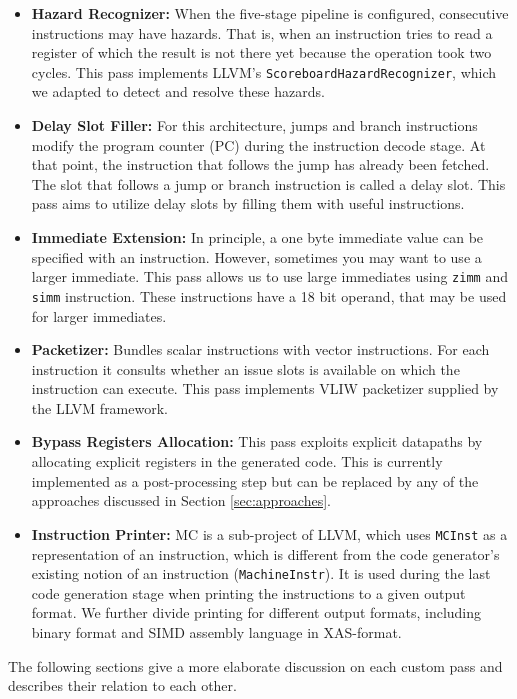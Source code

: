 \begin{itemize}
	\item \textbf{Hazard Recognizer:} When the five-stage pipeline is configured, consecutive instructions may have hazards. That is, when an instruction tries to read a register of which the result is not there yet because the operation took two cycles. This pass implements LLVM's \texttt{ScoreboardHazardRecognizer}, which we adapted to detect and resolve these hazards.
	\item \textbf{Delay Slot Filler:} For this architecture, jumps and branch instructions modify the program counter (PC) during the instruction decode stage. At that point, the instruction that follows the jump has already been fetched. The slot that follows a jump or branch instruction is called a delay slot. This pass aims to utilize delay slots by filling them with useful instructions.%
	\item \textbf{Immediate Extension:} In principle, a one byte immediate value can be specified with an instruction. However, sometimes you may want to use a larger immediate. This pass allows us to use large immediates using \texttt{zimm} and \texttt{simm} instruction. These instructions have a 18 bit operand, that may be used for larger immediates.%
	\item \textbf{Packetizer:} Bundles scalar instructions with vector instructions. For each instruction it consults whether an issue slots is available on which the instruction can execute. This pass implements VLIW packetizer supplied by the LLVM framework.
	\item \textbf{Bypass Registers Allocation:} This pass exploits explicit datapaths by allocating explicit registers in the generated code. This is currently implemented as a post-processing step but can be replaced by any of the approaches discussed in Section \ref{sec:approaches}.
	\item \textbf{Instruction Printer:} MC is a sub-project of LLVM, which uses \texttt{MCInst} as a representation of an instruction, which is different from the code generator's existing notion of an instruction (\texttt{MachineInstr}). It is used during the last code generation stage when printing the instructions to a given output format. We further divide printing for different output formats, including binary format and SIMD assembly language in XAS-format. 


\end{itemize}
The following sections give a more elaborate discussion on each custom pass and describes their relation to each other.

